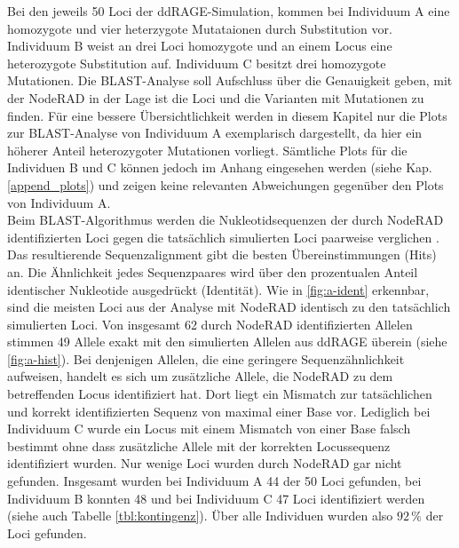 Bei den jeweils 50 Loci der ddRAGE-Simulation, kommen bei Individuum A eine homozygote und vier heterzygote Mutataionen durch Substitution vor. Individuum B weist an drei Loci homozygote und an einem Locus eine heterozygote Substitution auf. Individuum C besitzt drei homozygote Mutationen. Die BLAST-Analyse soll Aufschluss über die Genauigkeit geben, mit der NodeRAD in der Lage ist die Loci und die Varianten mit Mutationen zu finden. Für eine bessere Übersichtlichkeit werden in diesem Kapitel nur die Plots zur BLAST-Analyse von Individuum A exemplarisch dargestellt, da hier ein höherer Anteil heterozygoter Mutationen vorliegt. Sämtliche Plots für die Individuen B und C können jedoch im Anhang eingesehen werden (siehe Kap. \ref{append_plots}) und zeigen keine relevanten Abweichungen gegenüber den Plots von Individuum A.\\

Beim BLAST-Algorithmus werden die Nukleotidsequenzen der durch NodeRAD identifizierten Loci gegen die tatsächlich simulierten Loci paarweise verglichen \cite{gaedeke_2007}. Das resultierende Sequenzalignment gibt die besten Übereinstimmungen (Hits) an. Die Ähnlichkeit jedes Sequenzpaares wird über den prozentualen Anteil identischer Nukleotide ausgedrückt (Identität). Wie in \autoref{fig:a-ident} erkennbar, sind die meisten Loci aus der Analyse mit NodeRAD identisch zu den tatsächlich simulierten Loci. Von insgesamt 62 durch NodeRAD identifizierten Allelen stimmen 49 Allele exakt mit den simulierten Allelen aus ddRAGE überein (siehe \autoref{fig:a-hist}). Bei denjenigen Allelen, die eine geringere Sequenzähnlichkeit aufweisen, handelt es sich um zusätzliche Allele, die NodeRAD zu dem betreffenden Locus identifiziert hat. Dort liegt ein Mismatch zur tatsächlichen und korrekt identifizierten Sequenz von maximal einer Base vor. Lediglich bei Individuum C wurde ein Locus mit einem Mismatch von einer Base falsch bestimmt ohne dass zusätzliche Allele mit der korrekten Locussequenz identifiziert wurden. Nur wenige Loci wurden durch NodeRAD gar nicht gefunden. Insgesamt wurden bei Individuum A 44 der 50 Loci gefunden, bei Individuum B konnten 48 und bei Individuum C 47 Loci identifiziert werden (siehe auch Tabelle \ref{tbl:kontingenz}). Über alle Individuen wurden also $92\, \%$ der Loci gefunden.\\

\newpage


